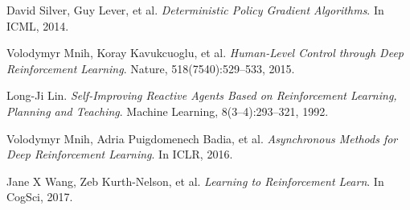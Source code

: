 \documentclass[11pt,twocolumn]{jarticle} %
\begin{document}
\begin{thebibliography}{9}
David Silver, Guy Lever, et al. \textsl{Deterministic Policy Gradient Algorithms}. In ICML, 2014.

Volodymyr Mnih, Koray Kavukcuoglu, et al. \textsl{Human-Level Control through Deep Reinforcement Learning}. Nature, 518(7540):529–533, 2015.

Long-Ji Lin. \textsl{Self-Improving Reactive Agents Based on Reinforcement Learning, Planning and Teaching}. Machine Learning, 8(3–4):293–321, 1992.

Volodymyr Mnih, Adria Puigdomenech Badia, et al. \textsl{Asynchronous Methods for Deep Reinforcement Learning}. In ICLR, 2016.

Jane X Wang, Zeb Kurth-Nelson, et al. \textsl{Learning to Reinforcement Learn}. In CogSci, 2017.

\end{thebibliography}
\end{document}
